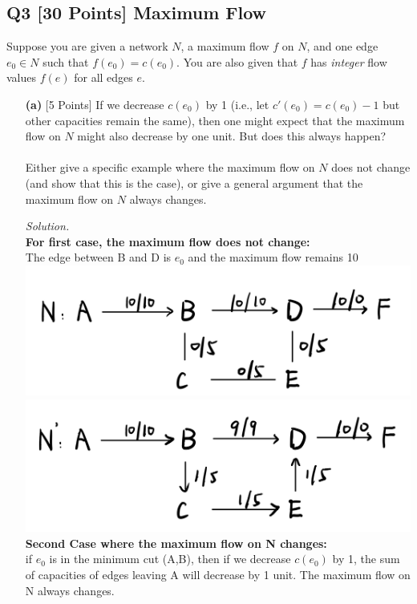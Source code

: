\documentclass[10pt]{article}
\begin{document}
\subsection*{Q3 [30 Points] Maximum Flow}
Suppose you are given a network $N$, a maximum flow $f$ on $N$, and one edge $e_0 \in N$ such that $f(e_0) = c(e_0)$. You are also given that $f$ has \textit{integer} flow values $f(e)$ for all edges $e$.
\begin{enumerate}
    \item [\textbf{(a)}] {[5 Points]} If we decrease $c(e_0)$ by 1 (i.e., let $c'(e_0) = c(e_0) − 1$ but other capacities remain the same), then one might expect that the maximum flow on $N$ might also decrease by one unit. But does this always happen?\\
    \\
    Either give a specific example where the maximum flow on $N$ does not change (and show that this is the case), or give a general argument that the maximum flow on $N$ always changes.
    \begin{mdframed}
        \textit{Solution.}\\
        \textbf{For first case, the maximum flow does not change:}\\
        The edge between B and D is $e_0$ and the maximum flow remains 10\\
        \includegraphics[scale= 0.12]{hw2/N.jpg}
        \includegraphics[scale= 0.12]{hw2/N1.jpg}\\
        \textbf{Second Case where the maximum flow on N changes:}\\
        if $e_0$ is in the minimum cut (A,B), then if we decrease $c(e_0)$ by 1, the sum of capacities of edges leaving A will decrease by 1 unit. The maximum flow on N always changes.

\end{mdframed}
\end{enumerate}
\end{document}
